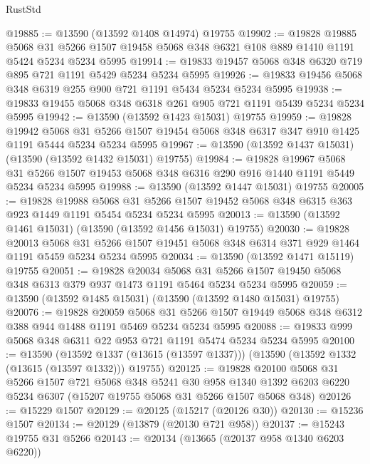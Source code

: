 \begin{lexlean}{RustStd}
\begin{coremodule}
@19885 := @13590 (@13592 @1408 @14974) @19755
@19902 := @19828
    @19885
    @5068
    @31
    @5266
    @1507
    @19458
    @5068
    @348
    @6321
    @108
    @889
    @1410
    @1191
    @5424
    @5234
    @5234
    @5995
@19914 := @19833 @19457 @5068 @348 @6320 @719 @895 @721 @1191 @5429 @5234 @5234 @5995
@19926 := @19833 @19456 @5068 @348 @6319 @255 @900 @721 @1191 @5434 @5234 @5234 @5995
@19938 := @19833 @19455 @5068 @348 @6318 @261 @905 @721 @1191 @5439 @5234 @5234 @5995
@19942 := @13590 (@13592 @1423 @15031) @19755
@19959 := @19828
    @19942
    @5068
    @31
    @5266
    @1507
    @19454
    @5068
    @348
    @6317
    @347
    @910
    @1425
    @1191
    @5444
    @5234
    @5234
    @5995
@19967 := @13590 (@13592 @1437 @15031) (@13590 (@13592 @1432 @15031) @19755)
@19984 := @19828
    @19967
    @5068
    @31
    @5266
    @1507
    @19453
    @5068
    @348
    @6316
    @290
    @916
    @1440
    @1191
    @5449
    @5234
    @5234
    @5995
@19988 := @13590 (@13592 @1447 @15031) @19755
@20005 := @19828
    @19988
    @5068
    @31
    @5266
    @1507
    @19452
    @5068
    @348
    @6315
    @363
    @923
    @1449
    @1191
    @5454
    @5234
    @5234
    @5995
@20013 := @13590 (@13592 @1461 @15031) (@13590 (@13592 @1456 @15031) @19755)
@20030 := @19828
    @20013
    @5068
    @31
    @5266
    @1507
    @19451
    @5068
    @348
    @6314
    @371
    @929
    @1464
    @1191
    @5459
    @5234
    @5234
    @5995
@20034 := @13590 (@13592 @1471 @15119) @19755
@20051 := @19828
    @20034
    @5068
    @31
    @5266
    @1507
    @19450
    @5068
    @348
    @6313
    @379
    @937
    @1473
    @1191
    @5464
    @5234
    @5234
    @5995
@20059 := @13590 (@13592 @1485 @15031) (@13590 (@13592 @1480 @15031) @19755)
@20076 := @19828
    @20059
    @5068
    @31
    @5266
    @1507
    @19449
    @5068
    @348
    @6312
    @388
    @944
    @1488
    @1191
    @5469
    @5234
    @5234
    @5995
@20088 := @19833 @999 @5068 @348 @6311 @22 @953 @721 @1191 @5474 @5234 @5234 @5995
@20100 := @13590
    (@13592 @1337 (@13615 (@13597 @1337)))
    (@13590 (@13592 @1332 (@13615 (@13597 @1332))) @19755)
@20125 := @19828
    @20100
    @5068
    @31
    @5266
    @1507
    @721
    @5068
    @348
    @5241
    @30
    @958
    @1340
    @1392
    @6203
    @6220
    @5234
    @6307
    (@15207 @19755 @5068 @31 @5266 @1507 @5068 @348)
@20126 := @15229 @1507
@20129 := @20125 (@15217 (@20126 @30))
@20130 := @15236 @1507
@20134 := @20129 (@13879 (@20130 @721 @958))
@20137 := @15243 @19755 @31 @5266
@20143 := @20134 (@13665 (@20137 @958 @1340 @6203 @6220))

\end{coremodule}
\end{lexlean}
